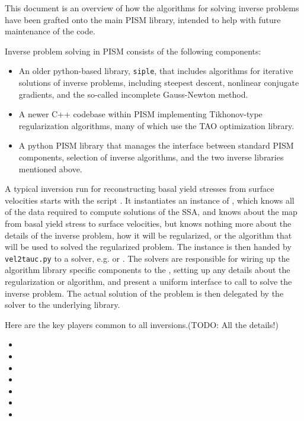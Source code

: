 \documentclass[titlepage,letterpaper,final]{scrartcl}
\begin{document}
This document is an overview of how the algorithms for solving inverse problems have been grafted onto the main PISM library, intended to
help with future maintenance of the code.

Inverse problem solving in PISM consists of the following components:

\begin{itemize}
\item An older python-based library, {\tt siple}, that includes algorithms for iterative solutions of inverse problems, including steepest descent,
nonlinear conjugate gradients, and the so-called incomplete Gauss-Newton method.

\item A newer 
C++ codebase within PISM implementing Tikhonov-type regularization
algorithms, many of which use the TAO \cite{tao-user-ref} optimization library.

\item A python PISM library that manages the interface between standard PISM components, selection of inverse algorithms, and the two inverse libraries mentioned above.

\end{itemize}

A typical inversion run for reconstructing basal yield stresses from surface velocities starts with the script . It instantiates an instance of , which knows all of the data required to compute solutions of the SSA, and knows about the map from basal yield stress to surface velocities, but knows nothing more about the details 
of the inverse problem, how it will be regularized, or the algorithm that will
be used to solved the regularized problem.  The  instance
is then handed by {\tt vel2tauc.py} to a solver, e.g.  or 
.  The solvers are responsible
for wiring up the algorithm library specific components to the , setting up any details about the regularization or algorithm, and present a uniform interface to call to solve the inverse problem. The actual solution of the problem is then delegated by the solver
to the underlying library.

Here are the key players common to all inversions.(TODO: All the details!)
\begin{itemize}
\item{}
\item{}
\item{}
\item{}
\item{}
\item{}
\item{}
\end{itemize}
\end{document}
